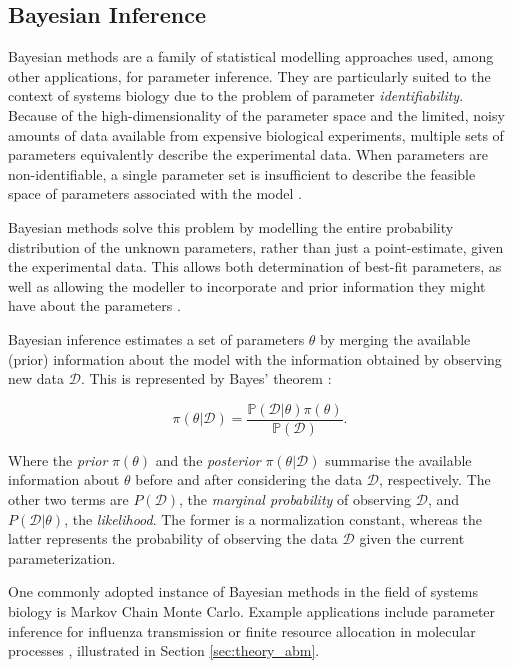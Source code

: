 \documentclass[bsc,frontabs,singlespacing,parskip,deptreport]{infthesis}
\begin{document}
\subsection{Bayesian Inference}\label{sec:bayesian_inference}
Bayesian methods are a family of statistical modelling approaches used, among other applications, for parameter inference. They are particularly suited to the context of systems biology \cite{P33} due to the problem of parameter \textit{identifiability}. Because of the high-dimensionality of the parameter space and the limited, noisy amounts of data available from expensive biological experiments, multiple sets of parameters equivalently describe the experimental data. When parameters are non-identifiable, a single parameter set is insufficient to describe the feasible space of parameters associated with the model \cite{8374537}.

Bayesian methods solve this problem by modelling the entire probability distribution of the unknown parameters, rather than just a point-estimate, given the experimental data. This allows both determination of best-fit parameters, as well as allowing the modeller to incorporate and prior information they might have about the parameters \cite{pmid24457334}.

Bayesian inference estimates a set of parameters $\theta$ by merging the available (prior) information about the model with the information obtained by observing new data $\mathscr{D}$. This is represented by Bayes’ theorem \cite{P34}:

\begin{equation}
    \pi(\theta | \mathscr{D}) = \frac{\mathbb{P}(\mathscr{D} | \theta)\pi(\theta)}{\mathbb{P}(\mathscr{D})}.
\end{equation}

Where the \textit{prior} $\pi(\theta)$ and the \textit{posterior} $\pi(\theta|\mathscr{D})$ summarise the available information about $\theta$ before and after considering the data $\mathscr{D}$, respectively. The other two terms are $P(\mathscr{D})$, the \textit{marginal probability} of observing $\mathscr{D}$, and $P(\mathscr{D}|\theta)$, the \textit{likelihood}. The former is a normalization constant, whereas the latter represents the probability of observing the data $\mathscr{D}$ given the current parameterization.

One commonly adopted instance of Bayesian methods in the field of systems biology is Markov Chain Monte Carlo. Example applications include parameter inference for influenza transmission \cite{mathews2007biological} or finite resource allocation in molecular processes \cite{P21}, illustrated in Section \ref{sec:theory_abm}. 
\end{document}
